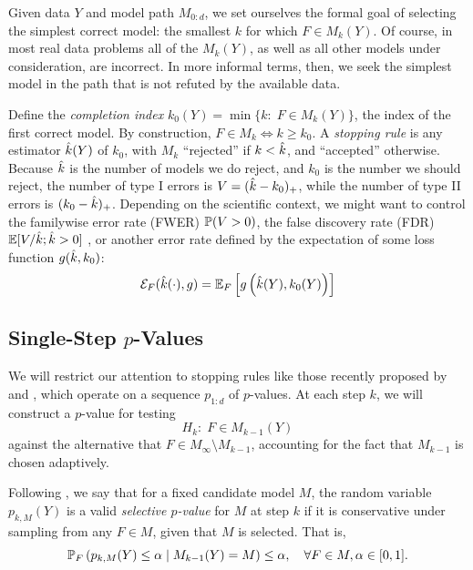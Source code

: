 \documentclass{article}
\begin{document}
Given data $Y$ and model path $M_{0:d}$, we set ourselves the formal goal of selecting the simplest correct model: the smallest $k$ for which $F\in M_k(Y)$. Of course, in most real data problems all of the $M_k(Y)$, as well as all other models under consideration, are incorrect. In more informal terms, then, we seek the simplest model in the path that is not refuted by the available data.

Define the {\em completion index} $k_0(Y) = \min\{k:\; F \in M_k(Y)\}$, the index of the first correct model. By construction, $F\in M_k \iff k \geq k_0$. A {\em stopping rule} is any estimator $\hk(Y)$ of $k_0$, with $M_k$ ``rejected'' if $k < \hk$, and ``accepted'' otherwise. Because $\hk$ is the number of models we do reject, and $k_0$ is the number we should reject, the number of type I errors is $V=(\hk-k_0)_+$, while the number of type II errors is $(k_0-\hk)_+$. Depending on the scientific context, we might want to control the familywise error rate (FWER) $\P(V>0)$, the false discovery rate (FDR) $\E[V/\hk; \hk>0]$ \citep{benjamini1995controlling}, or another error rate defined by the expectation of some loss function $g(\hk, k_0)$:
\begin{equation}\label{eq:errRate}
\Err_F(\hk(\cdot), g) = \E_F\left[ g\left(\hk(Y), k_0(Y)\right)\right]
\end{equation}

\subsection{Single-Step $p$-Values}

We will restrict our attention to stopping rules like those recently proposed by \citet{gsell2013sequential} and \citet{li2015accumulation}, which operate on a sequence $p_{1:d}$ of $p$-values. At each step $k$, we will construct a $p$-value for testing
\[
H_{k}:\; F\in M_{k-1}(Y)
\]
against the alternative that $F\in M_\infty\setminus M_{k-1}$, accounting for the fact that $M_{k-1}$ is chosen adaptively.

Following \citet{fithian2014optimal}, we say that for a fixed candidate model $M$, the random variable $p_{k,M}(Y)$ is a valid {\em selective $p$-value} for $M$ at step $k$ if it is conservative under sampling from any $F\in M$, given that $M$ is selected. That is,
\begin{equation}
\P_F\left(p_{k,M}(Y) \leq \alpha \mid M_{k-1}(Y) = M\right) 
\leq \alpha, \quad \forall F\in M, \alpha \in [0,1].
\end{equation}
\end{document}
